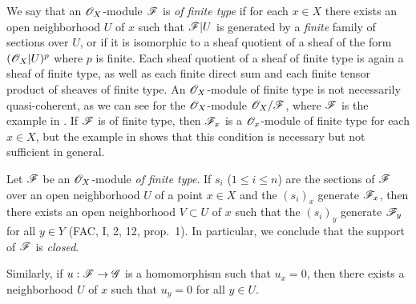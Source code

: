 \begin{env}[5.2.1]
\label{0.5.2.1}
We say that an $\mathscr{O}_X$-module $\mathscr{F}$ is \emph{of finite type} if for each $x\in X$ there exists an open neighborhood $U$ of $x$ such that $\mathscr{F}|U$ is generated by a \emph{finite} family of sections over $U$, or if it is isomorphic to a sheaf quotient of a sheaf of the form $(\mathscr{O}_X|U)^p$ where $p$ is finite.
Each sheaf quotient of a sheaf of finite type is again a sheaf of finite type, as well as each finite direct sum and each finite tensor product of sheaves of finite type.
An $\mathscr{O}_X$-module of finite type is not necessarily quasi-coherent, as we can see for the $\mathscr{O}_X$-module $\mathscr{O}_X/\mathscr{F}$, where $\mathscr{F}$ is the example in .
If $\mathscr{F}$ is of finite type, then $\mathscr{F}_x$ is a $\mathscr{O}_x$-module of finite type for each $x\in X$, but the example in  shows that this condition is necessary but not sufficient in general.
\end{env}

\begin{env}[5.2.2]
\label{0.5.2.2}
Let $\mathscr{F}$ be an $\mathscr{O}_X$-module \emph{of finite type}.
If $s_i$ ($1\leq i\leq n$) are the sections of $\mathscr{F}$ over an open neighborhood $U$ of a point $x\in X$ and the $(s_i)_x$ generate $\mathscr{F}_x$, then there exists an open neighborhood $V\subset U$ of $x$ such that the $(s_i)_y$ generate $\mathscr{F}_y$ for all $y\in Y$ (FAC, I, 2, 12, prop.~1).
In particular, we conclude that the support of $\mathscr{F}$ is \emph{closed}.

Similarly, if $u:\sh{F}\to\sh{G}$ is a homomorphism such that $u_x=0$, then there exists a neighborhood $U$ of $x$ such that $u_y=0$ for all $y\in U$.
\end{env}

